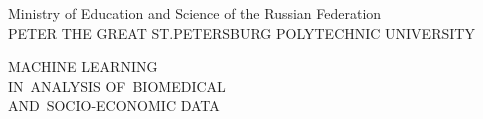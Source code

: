 \thispagestyle{empty}%
\makeatletter
{}
\makeatother




\begin{center}%
Ministry of Education and Science of the Russian Federation \\
		\noindent\makebox[\linewidth]{\rule{0.33\textwidth}{1.3pt}} %
 \uppercase{Peter the Great St.Petersburg Polytechnic University} 
\noindent\makebox[\linewidth]{\rule{\textwidth}{1.3pt}}
\end{center}%

%
%

%
%
\vspace{0pt plus4fill} %

\begin{center}%
\uppercase{\LARGE  Machine learning \\ in~analysis of~biomedical \\ and~socio-economic data}\\

\end{center}%

